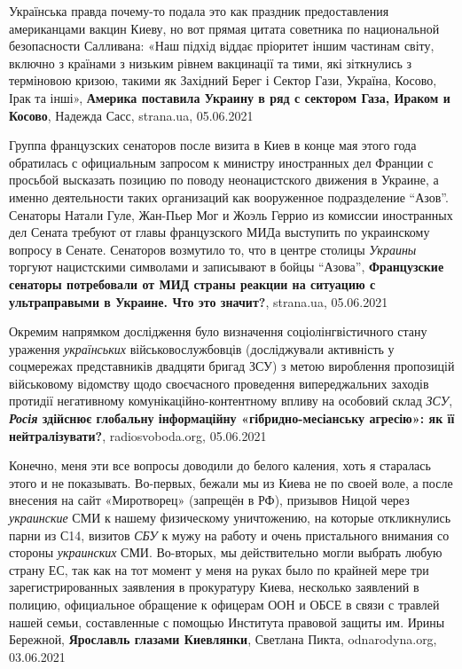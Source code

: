 Українська правда почему-то подала это как праздник предоставления американцами
вакцин Киеву, но вот прямая цитата советника по национальной безопасности
Салливана: «Наш підхід віддає пріоритет іншим частинам світу, включно з
країнами з низьким рівнем вакцинації та тими, які зіткнулись з терміновою
кризою, такими як Західний Берег і Сектор Гази, Україна, Косово, Ірак та інші»,
\textbf{Америка поставила Украину в ряд с сектором Газа, Ираком и Косово},
Надежда Сасс, strana.ua, 05.06.2021

Группа французских сенаторов после визита в Киев в конце мая этого года
обратилась с официальным запросом к министру иностранных дел Франции с просьбой
высказать позицию по поводу неонацистского движения в Украине, а именно
деятельности таких организаций как вооруженное подразделение \enquote{Азов}.
Сенаторы Натали Гуле, Жан-Пьер Мог и Жоэль Геррио из комиссии иностранных дел
Сената требуют от главы французского МИДа выступить по украинскому вопросу в
Сенате.  Сенаторов возмутило то, что в центре столицы \emph{Украины} торгуют
нацистскими символами и записывают в бойцы \enquote{Азова},
\textbf{Французские сенаторы потребовали от МИД страны реакции на ситуацию с ультраправыми в Украине. Что это значит?},
strana.ua, 05.06.2021

Окремим напрямком дослідження було визначення соціолінгвістичного стану
ураження \emph{українських} військовослужбовців (досліджували активність у соцмережах
представників двадцяти бригад ЗСУ) з метою вироблення пропозицій військовому
відомству щодо своєчасного проведення випереджальних заходів протидії
негативному комунікаційно-контентному впливу на особовий склад \emph{ЗСУ},
\textbf{\emph{Росія} здійснює глобальну інформаційну «гібридно-месіанську агресію»: як її нейтралізувати?},
radiosvoboda.org, 05.06.2021

Конечно, меня эти все вопросы доводили до белого каления, хоть я старалась
этого и не показывать. Во-первых, бежали мы из Киева не по своей воле, а после
внесения на сайт «Миротворец» (запрещён в РФ), призывов Ницой через
\emph{украинские} СМИ к нашему физическому уничтожению, на которые откликнулись
парни из С14, визитов \emph{СБУ} к мужу на работу и очень пристального внимания
со стороны \emph{украинских} СМИ.  Во-вторых, мы действительно могли выбрать
любую страну ЕС, так как на тот момент у меня на руках было по крайней мере три
зарегистрированных заявления в прокуратуру Киева, несколько заявлений в
полицию, официальное обращение к офицерам ООН и ОБСЕ в связи с травлей нашей
семьи, составленные с помощью Института правовой защиты им. Ирины Бережной,
\textbf{Ярославль глазами Киевлянки},
Светлана Пикта, odnarodyna.org, 03.06.2021

